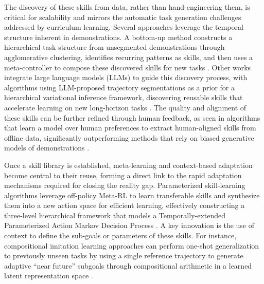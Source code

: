 \documentclass[11pt]{article}
\begin{document}
The discovery of these skills from data, rather than hand-engineering them, is critical for scalability and mirrors the automatic task generation challenges addressed by curriculum learning. Several approaches leverage the temporal structure inherent in demonstrations. A bottom-up method constructs a hierarchical task structure from unsegmented demonstrations through agglomerative clustering, identifies recurring patterns as skills, and then uses a meta-controller to compose these discovered skills for new tasks \cite{ref383}. Other works integrate large language models (LLMs) to guide this discovery process, with algorithms using LLM-proposed trajectory segmentations as a prior for a hierarchical variational inference framework, discovering reusable skills that accelerate learning on new long-horizon tasks \cite{ref384}. The quality and alignment of these skills can be further refined through human feedback, as seen in algorithms that learn a model over human preferences to extract human-aligned skills from offline data, significantly outperforming methods that rely on biased generative models of demonstrations \cite{ref385}.

Once a skill library is established, meta-learning and context-based adaptation become central to their reuse, forming a direct link to the rapid adaptation mechanisms required for closing the reality gap. Parameterized skill-learning algorithms leverage off-policy Meta-RL to learn transferable skills and synthesize them into a new action space for efficient learning, effectively constructing a three-level hierarchical framework that models a Temporally-extended Parameterized Action Markov Decision Process \cite{ref386}. A key innovation is the use of context to define the sub-goals or parameters of these skills. For instance, compositional imitation learning approaches can perform one-shot generalization to previously unseen tasks by using a single reference trajectory to generate adaptive ``near future'' subgoals through compositional arithmetic in a learned latent representation space \cite{ref387}.
\end{document}
